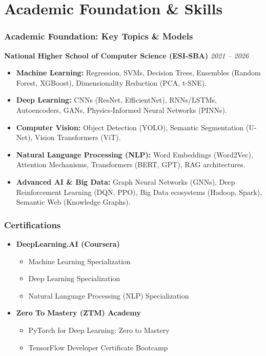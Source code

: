 \documentclass[aspectratio=169]{beamer}
\begin{document}
\section{Academic Foundation \& Skills}
\begin{frame}
\frametitle{Academic Foundation: Key Topics \& Models}
\textbf{National Higher School of Computer Science (ESI-SBA)} \hfill \textit{2021 -- 2026}
\vspace{0.2cm}
\begin{itemize}
    \item \textbf{Machine Learning:} Regression, SVMs, Decision Trees, Ensembles (Random Forest, XGBoost), Dimensionality Reduction (PCA, t-SNE).
    \item \textbf{Deep Learning:} CNNs (ResNet, EfficientNet), RNNs/LSTMs, Autoencoders, GANs, Physics-Informed Neural Networks (PINNs).
    \item \textbf{Computer Vision:} Object Detection (YOLO), Semantic Segmentation (U-Net), Vision Transformers (ViT).
    \item \textbf{Natural Language Processing (NLP):} Word Embeddings (Word2Vec), Attention Mechanisms, Transformers (BERT, GPT), RAG architectures.
    \item \textbf{Advanced AI \& Big Data:} Graph Neural Networks (GNNs), Deep Reinforcement Learning (DQN, PPO), Big Data ecosystems (Hadoop, Spark), Semantic Web (Knowledge Graphs).
\end{itemize}
\end{frame}

\begin{frame}
\frametitle{Certifications}
\vspace{0.3cm}
\begin{itemize}
    \item \textbf{DeepLearning.AI (Coursera)}
    \begin{itemize}
        \item Machine Learning Specialization
        \item Deep Learning Specialization
        \item Natural Language Processing (NLP) Specialization
    \end{itemize}
    \vspace{0.4cm}
    \item \textbf{Zero To Mastery (ZTM) Academy}
    \begin{itemize}
        \item PyTorch for Deep Learning: Zero to Mastery
        \item TensorFlow Developer Certificate Bootcamp
    \end{itemize}
\end{itemize}
\end{frame}
\end{document}

